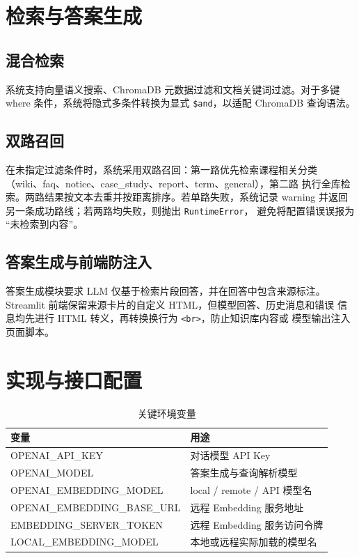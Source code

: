 \documentclass[conference]{IEEEtran}
\begin{document}
\section{检索与答案生成}
\subsection{混合检索}
系统支持向量语义搜索、ChromaDB 元数据过滤和文档关键词过滤。对于多键
where 条件，系统将隐式多条件转换为显式 \texttt{\$and}，以适配 ChromaDB
查询语法。

\subsection{双路召回}
在未指定过滤条件时，系统采用双路召回：第一路优先检索课程相关分类
（wiki、faq、notice、case\_study、report、term、general），第二路
执行全库检索。两路结果按文本去重并按距离排序。若单路失败，系统记录
warning 并返回另一条成功路线；若两路均失败，则抛出 \texttt{RuntimeError}，
避免将配置错误误报为 ``未检索到内容''。

\subsection{答案生成与前端防注入}
答案生成模块要求 LLM 仅基于检索片段回答，并在回答中包含来源标注。
Streamlit 前端保留来源卡片的自定义 HTML，但模型回答、历史消息和错误
信息均先进行 HTML 转义，再转换换行为 \texttt{<br>}，防止知识库内容或
模型输出注入页面脚本。

\section{实现与接口配置}
\begin{table}[!t]
\centering
\caption{关键环境变量}
\label{tab:env}
\begin{tabular}{@{}ll@{}}
\toprule
\textbf{变量} & \textbf{用途} \\
\midrule
OPENAI\_API\_KEY & 对话模型 API Key \\
OPENAI\_MODEL & 答案生成与查询解析模型 \\
OPENAI\_EMBEDDING\_MODEL & local / remote / API 模型名 \\
OPENAI\_EMBEDDING\_BASE\_URL & 远程 Embedding 服务地址 \\
EMBEDDING\_SERVER\_TOKEN & 远程 Embedding 服务访问令牌 \\
LOCAL\_EMBEDDING\_MODEL & 本地或远程实际加载的模型名 \\
\bottomrule
\end{tabular}
\end{table}
\end{document}

